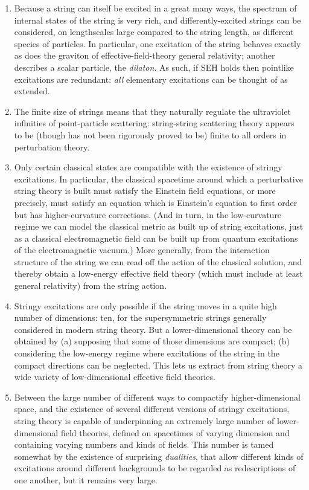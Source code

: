 \documentclass[12pt]{article}
\begin{document}
\begin{enumerate}
\item Because a string can itself be excited in a great many ways, the spectrum of internal states of the string is very rich, and differently-excited strings can be considered, on lengthscales large compared to the string length, as different species of particles. In particular, one excitation of the string behaves exactly as does the graviton of effective-field-theory general relativity; another describes a scalar particle, the \emph{dilaton}. As such, if SEH holds then pointlike excitations are redundant: \emph{all} elementary excitations can be thought of as extended.
\item The finite size of strings means that they naturally regulate the ultraviolet infinities of point-particle scattering: string-string scattering theory appears to be (though has not been rigorously proved to be) finite to all orders in perturbation theory.
\item Only certain classical states are compatible with the existence of stringy excitations. In particular, the classical spacetime around which a perturbative string theory is built must satisfy the Einstein field equations, or more precisely, must satisfy an equation which is Einstein's equation to first order but has higher-curvature corrections. (And in turn, in the low-curvature regime we can model the classical metric as built up of string excitations, just as a classical electromagnetic field can be built up from quantum excitations of the electromagnetic vacuum.)  More generally, from the interaction structure of the string we can read off the action of the classical solution, and thereby obtain a low-energy effective field theory (which must include at least general relativity) from the string action.
\item Stringy excitations are only possible if the string moves in a quite high number of dimensions: ten, for the supersymmetric strings generally considered in modern string theory. But a lower-dimensional theory can be obtained by (a) supposing that some of those dimensions are compact; (b) considering the low-energy regime where excitations of the string in the compact directions can be neglected. This lets us extract from string theory a wide variety of low-dimensional effective field theories.
\item Between the large number of different ways to compactify higher-dimensional space, and the existence of several different versions of stringy excitations, string theory is capable of underpinning an extremely large number of lower-dimensional field theories, defined on spacetimes of varying dimension and containing varying numbers and kinds of fields. This number is tamed somewhat by the existence of surprising \emph{dualities}, that allow different kinds of excitations around different backgrounds to be regarded as redescriptions of one another, but it remains very large.

\end{enumerate}
\end{document}
